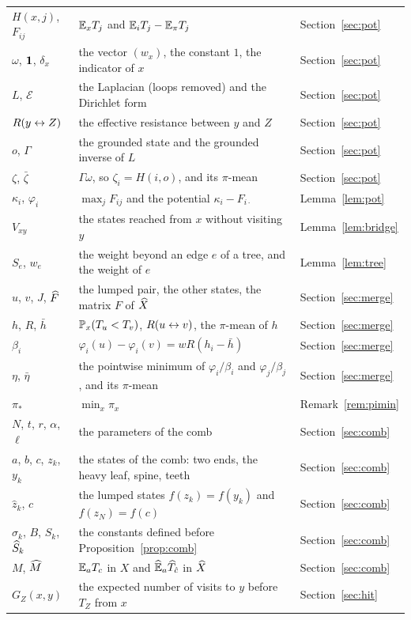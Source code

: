 \begin{center}
\begin{tabular}{@{}lp{}l@{}}
$H(x,j)$, $F_{ij}$ & $\mathbb{E}_xT_j$ and $\mathbb{E}_iT_j-\mathbb{E}_\pi T_j$ & Section~\ref{sec:pot}\\
$\omega$, $\mathbf{1}$, $\delta_x$ & the vector $(w_x)$, the constant $1$, the indicator of $x$ & Section~\ref{sec:pot}\\
$L$, $\mathcal E$ & the Laplacian (loops removed) and the Dirichlet form & Section~\ref{sec:pot}\\
$R(y\leftrightarrow Z)$ & the effective resistance between $y$ and $Z$ & Section~\ref{sec:pot}\\
$o$, $\Gamma$ & the grounded state and the grounded inverse of $L$ & Section~\ref{sec:pot}\\
$\zeta$, $\bar\zeta$ & $\Gamma\omega$, so $\zeta_i=H(i,o)$, and its $\pi$-mean & Section~\ref{sec:pot}\\
$\kappa_i$, $\varphi_i$ & $\max_jF_{ij}$ and the potential $\kappa_i-F_{i\cdot}$ & Lemma~\ref{lem:pot}\\
$V_{xy}$ & the states reached from $x$ without visiting $y$ & Lemma~\ref{lem:bridge}\\
$S_e$, $w_e$ & the weight beyond an edge $e$ of a tree, and the weight of $e$ & Lemma~\ref{lem:tree}\\
$u$, $v$, $J$, $\widehat{F}$ & the lumped pair, the other states, the matrix $F$ of $\widehat{X}$ & Section~\ref{sec:merge}\\
$h$, $R$, $\bar h$ & $\mathbb{P}_x(T_u<T_v)$, $R(u\leftrightarrow v)$, the $\pi$-mean of $h$ & Section~\ref{sec:merge}\\
$\beta_i$ & $\varphi_i(u)-\varphi_i(v)=wR(h_i-\bar h)$ & Section~\ref{sec:merge}\\
$\eta$, $\bar\eta$ & the pointwise minimum of $\varphi_i/\beta_i$ and $\varphi_j/\beta_j$, and its $\pi$-mean & Section~\ref{sec:merge}\\
$\pi_*$ & $\min_x\pi_x$ & Remark~\ref{rem:pimin}\\
$N$, $t$, $r$, $\alpha$, $\ell$ & the parameters of the comb & Section~\ref{sec:comb}\\
$a$, $b$, $c$, $z_k$, $y_k$ & the states of the comb: two ends, the heavy leaf, spine, teeth & Section~\ref{sec:comb}\\
$\hat z_k$, $\hat c$ & the lumped states $f(z_k)=f(y_k)$ and $f(z_N)=f(c)$ & Section~\ref{sec:comb}\\
$\sigma_k$, $B$, $S_k$, $\widehat{S}_k$ & the constants defined before Proposition~\ref{prop:comb} & Section~\ref{sec:comb}\\
$M$, $\widehat{M}$ & $\mathbb{E}_aT_c$ in $X$ and $\widehat{\mathbb{E}}_a\widehat T_{\hat c}$ in $\widehat{X}$ & Section~\ref{sec:comb}\\
$G_Z(x,y)$ & the expected number of visits to $y$ before $T_Z$ from $x$ & Section~\ref{sec:hit}\\
\bottomrule
\end{tabular}
\end{center}
